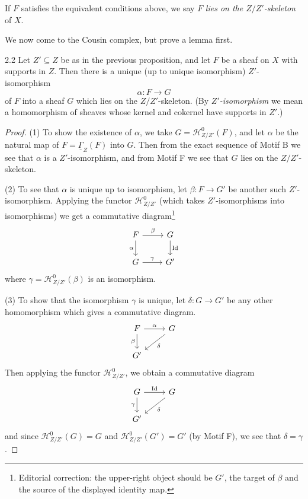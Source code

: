 \begin{definition*}
If $F$ satisfies the equivalent conditions above, we say $F$ \emph{lies on the $Z/Z'$-skeleton} of $X$.
\end{definition*}

We now come to the Cousin complex, but prove a lemma first.

\begin{booklemma}{2.2}\label{lem:4.2.2}
Let $Z'\subseteq Z$ be as in the previous proposition, and let $F$ be a sheaf on $X$ with supports in $Z$. Then there is a unique (up to unique isomorphism) $Z'$-isomorphism
\[
\alpha\colon F\longrightarrow G
\]
of $F$ into a sheaf $G$ which lies on the $Z/Z'$-skeleton. (By \emph{$Z'$-isomorphism} we mean a homomorphism of sheaves whose kernel and cokernel have supports in $Z'$.)
\end{booklemma}

\begin{proof}
(1) To show the existence of $\alpha$, we take $G=\mathcal{H}_{Z/Z'}^{0}(F)$, and let $\alpha$ be the natural map of $F=\underline{\Gamma}_Z(F)$ into $G$. Then from the exact sequence of Motif B we see that $\alpha$ is a $Z'$-isomorphism, and from Motif F we see that $G$ lies on the $Z/Z'$-skeleton.

(2) To see that $\alpha$ is unique up to isomorphism, let $\beta\colon F\to G'$ be another such $Z'$-isomorphism. Applying the functor $\mathcal{H}_{Z/Z'}^{0}$ (which takes $Z'$-isomorphisms into isomorphisms) we get a commutative diagram\footnote{Editorial correction: the upper-right object should be $G'$, the target of $\beta$ and the source of the displayed identity map.}
\[
\begin{tikzcd}
F \arrow[r, "\beta"] \arrow[d, "\alpha"'] & G \arrow[d, "\operatorname{Id}"] \\
G \arrow[r, "\gamma"] & G'
\end{tikzcd}
\]
where $\gamma=\mathcal{H}_{Z/Z'}^{0}(\beta)$ is an isomorphism.

(3) To show that the isomorphism $\gamma$ is unique, let $\delta\colon G\to G'$ be any other homomorphism which gives a commutative diagram.
\[
\begin{tikzcd}
	F \arrow[r, "\alpha"] \arrow[d, "\beta"'] & G \arrow[dl, "\delta"] \\
	G'
\end{tikzcd}
\]
Then applying the functor $\mathcal{H}_{Z/Z'}^{0}$, we obtain a commutative diagram
\[
\begin{tikzcd}
	G \arrow[r, "\operatorname{Id}"] \arrow[d, "\gamma"'] & G \arrow[dl, "\delta"] \\
	G'
\end{tikzcd}
\]
and since $\mathcal{H}_{Z/Z'}^{0}(G)=G$ and $\mathcal{H}_{Z/Z'}^{0}(G')=G'$ (by Motif F), we see that $\delta=\gamma$.
\end{proof}

